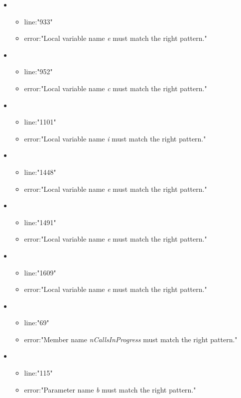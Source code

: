 \begin{itemize}
\begin{itemize}
	\end{itemize}
	\item 
	\begin{itemize} 
		\item line:"933" 
		\item error:"Local variable name \emph{e} must match the right pattern." 
	\end{itemize}
	\item 
	\begin{itemize} 
		\item line:"952" 
		\item error:"Local variable name \emph{c} must match the right pattern." 
	\end{itemize}
	\item 
	\begin{itemize} 
		\item line:"1101" 
		\item error:"Local variable name \emph{i} must match the right pattern." 
	\end{itemize}
	\item 
	\begin{itemize} 
		\item line:"1448" 
		\item error:"Local variable name \emph{e} must match the right pattern." 
	\end{itemize}
	\item 
	\begin{itemize} 
		\item line:"1491" 
		\item error:"Local variable name \emph{e} must match the right pattern." 
	\end{itemize}
	\item 
	\begin{itemize} 
		\item line:"1609" 
		\item error:"Local variable name \emph{e} must match the right pattern." 
	\end{itemize}
	\item 
	\begin{itemize} 
		\item line:"69" 
		\item error:"Member name \emph{nCallsInProgress} must match the right pattern." 
	\end{itemize}
	\item 
	\begin{itemize} 
		\item line:"115" 
		\item error:"Parameter name \emph{b} must match the right pattern." 

\end{itemize}
\end{itemize}
